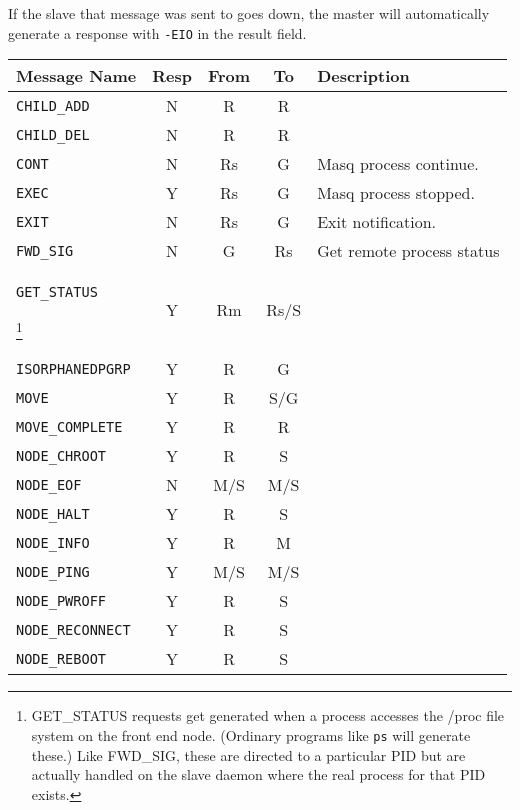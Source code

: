 If the slave that message was sent to goes down, the master will
automatically generate a response with \texttt{-EIO} in the result
field.


\newcommand{\msg}[1]{\texttt{#1}
                     \index{\texttt{#1}}
                     \index{\texttt{BPROC\_#1}}
}

\begin{tabular}{lcccp{1.5in}}
\hline
Message Name & Resp & From & To & Description\\
\hline
\msg{CHILD\_ADD}           & N & R    & R   \\
\msg{CHILD\_DEL}           & N & R    & R   \\
\msg{CONT}                 & N & Rs   & G   & Masq process continue. \\
\msg{EXEC}                 & Y & Rs   & G   & Masq process stopped. \\
\msg{EXIT}                 & N & Rs   & G   & Exit notification. \\
\msg{FWD\_SIG}             & N & G    & Rs  & Get remote process status \\
\msg{GET\_STATUS}
\footnote{GET\_STATUS requests get generated when a process accesses the /proc
   file system on the front end node.  (Ordinary programs like \texttt{ps}
   will generate these.)  Like FWD\_SIG, these are directed to a
   particular PID but are actually handled on the slave daemon where
   the real process for that PID exists.}  & Y & Rm   & Rs/S  \\
\msg{ISORPHANEDPGRP}       & Y & R    & G   \\
\msg{MOVE}                 & Y & R    & S/G \\
\msg{MOVE\_COMPLETE}       & Y & R    & R   \\
\msg{NODE\_CHROOT}         & Y & R    & S   \\
\msg{NODE\_EOF}            & N & M/S  & M/S \\
\msg{NODE\_HALT}           & Y & R    & S   \\
\msg{NODE\_INFO}           & Y & R    & M   \\
\msg{NODE\_PING}           & Y & M/S  & M/S \\
\msg{NODE\_PWROFF}         & Y & R    & S   \\
\msg{NODE\_RECONNECT}      & Y & R    & S   \\
\msg{NODE\_REBOOT}         & Y & R    & S   \\

\end{tabular}
